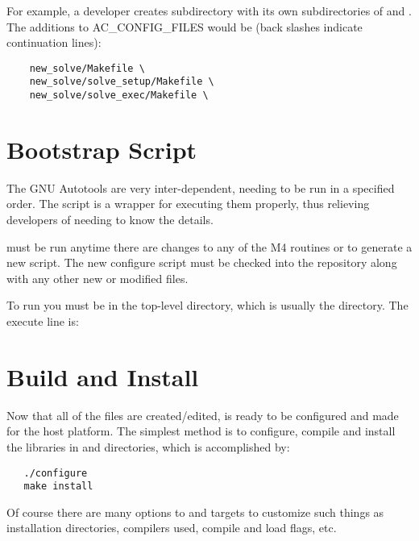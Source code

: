 For example, a developer creates subdirectory  with its own 
subdirectories of  and .  The additions to 
AC\_CONFIG\_FILES would be (back slashes indicate continuation lines):

\begin{verbatim}
    new_solve/Makefile \
    new_solve/solve_setup/Makefile \
    new_solve/solve_exec/Makefile \

\end{verbatim}

\section{Bootstrap Script}
\label{Bootstrap Script}


The GNU Autotools are very inter-dependent, needing to be run in a specified 
order.  The  script is a wrapper for executing them properly, 
thus relieving developers of needing to know the details.

 must be run anytime there are changes to any of the M4 routines
or  to generate a new  script.  The new configure
script must be checked into the \hypre{} repository along with any other new or
modified files.

To run  you must be in the top-level directory, which is usually the
 directory.  The execute line is:  

\section{Build and Install}
\label{Build and Install}


Now that all of the files are created/edited, \hypre{} is ready to be configured
and made for the host platform.  The simplest method is to configure, compile and
install the libraries in \file{hypre/lib} and \file{hypre/include} directories, which is
accomplished by:
\begin{verbatim}
   ./configure
   make install
\end{verbatim}

Of course there are many options to  and  targets to 
customize such things as installation directories, compilers used, compile and
load flags, etc.  

